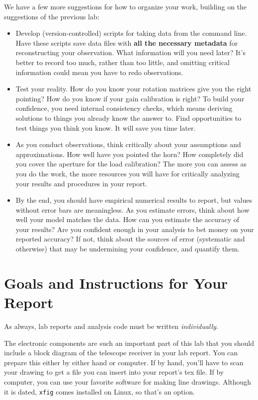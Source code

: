 \documentclass[11pt,preprint]{aastex}
\begin{document}
We have a few more suggestions for how to organize your work, building on the 
suggestions of the previous lab:
\begin{itemize}

\item Develop (version-controlled) scripts for taking data from the command line.
Have these scripts save data files with {\bf all the necessary metadata} for
reconstructing your observation. What information will you need later? It's
better to record too much, rather than too little, and omitting critical information could
mean you have to redo observations.

\item Test your reality. How do you know your rotation matrices give you the
right pointing? How do you know if your gain calibration is right? To build
your confidence, you need internal consistency checks, which means deriving
solutions to things you already know the answer to. Find opportunities
to test things you think you know. It will save you time later.

\item As you conduct observations, think critically about your assumptions and
approximations.  How well have you pointed the horn? How completely did
you cover the aperture for the load calibration? The more you can assess
as you do the work, the more resources you will have for critically analyzing your
results and procedures in your report.

\item By the end, you should have empirical numerical results to report, but
values without error bars are meaningless. As you estimate errors, think about how 
well your model matches the data. How can you estimate the
accuracy of your results? Are you confident enough in your analysis to
bet money on your reported accuracy? If not, think about the sources of error
(systematic and otherwise) that may be undermining your confidence, and quantify them.

\end{itemize}


\section{Goals and Instructions for Your Report} \label{sec:goals}

\noindent
As always, lab reports and analysis code must be written {\it individually}. 

The electronic components are such an important part of this
lab that you should include a block diagram of the telescope receiver
in your lab report. You can prepare this either by either hand or
computer. If by hand, you'll have to scan your drawing to get a file you can
insert into your report's tex file. If by computer, you can use your
favorite software for making line drawings.  Although it is dated, {\tt xfig}
comes installed on Linux, so that's an option.
\end{document}
